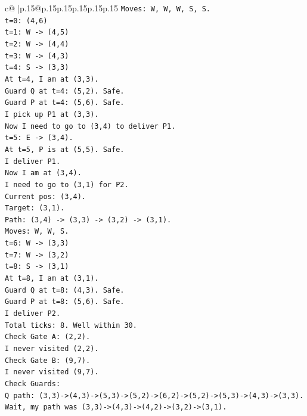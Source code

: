 \documentclass{article}
\begin{document}
{\begin{supertabular}{c@{$\;$}|p{.15\linewidth}@{}p{.15\linewidth}p{.15\linewidth}p{.15\linewidth}p{.15\linewidth}p{.15\linewidth}}
{{{\texttt{Moves: W, W, W, S, S.} \\
\texttt{t=0: (4,6)} \\
\texttt{t=1: W {-}> (4,5)} \\
\texttt{t=2: W {-}> (4,4)} \\
\texttt{t=3: W {-}> (4,3)} \\
\texttt{t=4: S {-}> (3,3)} \\
\texttt{At t=4, I am at (3,3).} \\
\texttt{Guard Q at t=4: (5,2). Safe.} \\
\texttt{Guard P at t=4: (5,6). Safe.} \\
\texttt{I pick up P1 at (3,3).} \\
\texttt{Now I need to go to (3,4) to deliver P1.} \\
\texttt{t=5: E {-}> (3,4).} \\
\texttt{At t=5, P is at (5,5). Safe.} \\
\texttt{I deliver P1.} \\
\texttt{Now I am at (3,4).} \\
\texttt{I need to go to (3,1) for P2.} \\
\texttt{Current pos: (3,4).} \\
\texttt{Target: (3,1).} \\
\texttt{Path: (3,4) {-}> (3,3) {-}> (3,2) {-}> (3,1).} \\
\texttt{Moves: W, W, S.} \\
\texttt{t=6: W {-}> (3,3)} \\
\texttt{t=7: W {-}> (3,2)} \\
\texttt{t=8: S {-}> (3,1)} \\
\texttt{At t=8, I am at (3,1).} \\
\texttt{Guard Q at t=8: (4,3). Safe.} \\
\texttt{Guard P at t=8: (5,6). Safe.} \\
\texttt{I deliver P2.} \\
\texttt{Total ticks: 8. Well within 30.} \\
\texttt{Check Gate A: (2,2).} \\
\texttt{I never visited (2,2).} \\
\texttt{Check Gate B: (9,7).} \\
\texttt{I never visited (9,7).} \\
\texttt{Check Guards:} \\
\texttt{Q path: (3,3){-}>(4,3){-}>(5,3){-}>(5,2){-}>(6,2){-}>(5,2){-}>(5,3){-}>(4,3){-}>(3,3).} \\
\texttt{Wait, my path was (3,3){-}>(4,3){-}>(4,2){-}>(3,2){-}>(3,1).} \\
}}}
\end{supertabular}}
\end{document}
